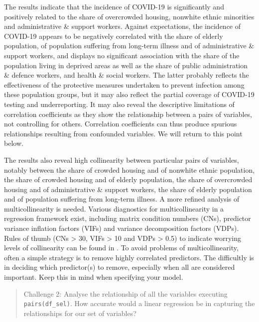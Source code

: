 \documentclass[
]{book}
\begin{document}
The results indicate that the incidence of COVID-19 is significantly and positively related to the share of overcrowded housing, nonwhite ethnic minorities and administrative \& support workers. Against expectations, the incidence of COVID-19 appears to be negatively correlated with the share of elderly population, of population suffering from long-term illness and of administrative \& support workers, and displays no significant association with the share of the population living in deprived areas as well as the share of public administration \& defence workers, and health \& social workers. The latter probably reflects the effectiveness of the protective measures undertaken to prevent infection among these population groups, but it may also reflect the partial coverage of COVID-19 testing and underreporting. It may also reveal the descriptive limitations of correlation coefficients as they show the relationship between a pairs of variables, not controlling for others. Correlation coefficients can thus produce spurious relationships resulting from confounded variables. We will return to this point below.

The results also reveal high collinearity between particular pairs of variables, notably between the share of crowded housing and of nonwhite ethnic population, the share of crowded housing and of elderly population, the share of overcrowded housing and of administrative \& support workers, the share of elderly population and of population suffering from long-term illness. A more refined analysis of multicollinearity is needed. Various diagnostics for multicollinearity in a regression framework exist, including matrix condition numbers (CNs), predictor variance inflation factors (VIFs) and variance decomposition factors (VDPs). Rules of thumb (CNs \textgreater{} 30, VIFs \textgreater{} 10 and VDPs \textgreater{} 0.5) to indicate worrying levels of collinearity can be found in \citet{belsley2005regression}. To avoid problems of multicollinearity, often a simple strategy is to remove highly correlated predictors. The difficultly is in deciding which predictor(s) to remove, especially when all are considered important. Keep this in mind when specifying your model.

\begin{quote}
Challenge 2:
Analyse the relationship of all the variables executing \texttt{pairs(df\_sel)}. How accurate would a linear regression be in capturing the relationships for our set of variables?
\end{quote}
\end{document}
